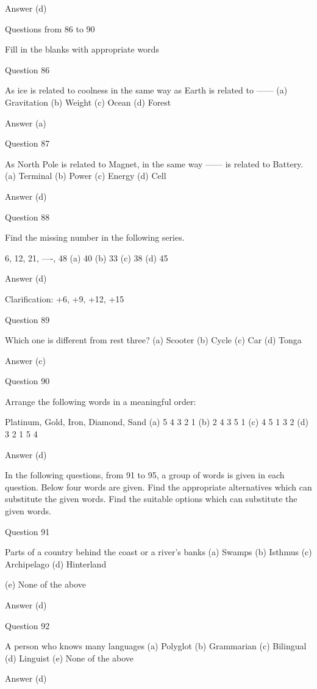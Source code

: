 Answer (d)


Questions from 86 to 90

Fill in the blanks with appropriate words

Question 86

As ice is related to coolness in the same way as Earth is related to ------
(a) Gravitation
(b) Weight
(c) Ocean
(d) Forest

Answer (a)

Question 87

As North Pole is related to Magnet, in the same way ------ is related to Battery.
(a) Terminal
(b) Power
(c) Energy
(d) Cell

Answer (d)

Question 88

Find the missing number in the following series.

6, 12, 21, ----, 48
(a) 40
(b) 33
(c) 38
(d) 45

Answer (d)

Clarification: +6, +9, +12, +15

Question 89

Which one is different from rest three?
(a) Scooter
(b) Cycle
(c) Car
(d) Tonga

Answer (c)

Question 90

Arrange the following words in a meaningful order:

Platinum, Gold, Iron, Diamond, Sand
(a) 5 4 3 2 1
(b) 2 4 3 5 1
(c) 4 5 1 3 2
(d) 3 2 1 5 4

Answer (d)



In the following questions, from 91 to 95, a group of words is given in each question. Below four words are given. Find the appropriate alternatives which can substitute the given words. Find the suitable options which can substitute the given words.

Question 91

Parts of a country behind the coast or a river’s banks
(a) Swamps
(b) Isthmus
(c) Archipelago
(d) Hinterland

(e) None of the above

Answer (d)

Question 92

A person who knows many languages
(a) Polyglot
(b) Grammarian
(c) Bilingual
(d) Linguist
(e) None of the above

Answer (d)

